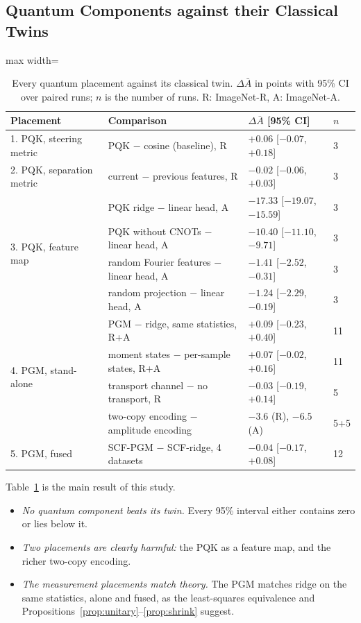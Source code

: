 \subsection{Quantum Components against their Classical Twins}

\begin{table}[t]
\centering
\caption{Every quantum placement against its classical twin. $\Delta\bar A$ in
points with 95\% CI over paired runs; $n$ is the number of runs.
R: ImageNet-R, A: ImageNet-A.}
\label{tab:quantum}
\setlength{\tabcolsep}{3pt}
\begin{adjustbox}{max width=\textwidth}
\begin{tabular}{llll}
\toprule
Placement & Comparison & $\Delta\bar A$ [95\% CI] & $n$ \\
\midrule
1. PQK, steering metric & PQK $-$ cosine (baseline), R & $+0.06$ [$-0.07$, $+0.18$] & 3 \\
2. PQK, separation metric & current $-$ previous features, R & $-0.02$ [$-0.06$, $+0.03$] & 3 \\
\multirow{4}{*}{3. PQK, feature map} & PQK ridge $-$ linear head, A & $-17.33$ [$-19.07$, $-15.59$] & 3 \\
 & PQK without CNOTs $-$ linear head, A & $-10.40$ [$-11.10$, $-9.71$] & 3 \\
 & random Fourier features $-$ linear head, A & $-1.41$ [$-2.52$, $-0.31$] & 3 \\
 & random projection $-$ linear head, A & $-1.24$ [$-2.29$, $-0.19$] & 3 \\
\midrule
\multirow{4}{*}{4. PGM, stand-alone} & PGM $-$ ridge, same statistics, R+A & $+0.09$ [$-0.23$, $+0.40$] & 11 \\
 & moment states $-$ per-sample states, R+A & $+0.07$ [$-0.02$, $+0.16$] & 11 \\
 & transport channel $-$ no transport, R & $-0.03$ [$-0.19$, $+0.14$] & 5 \\
 & two-copy encoding $-$ amplitude encoding & $-3.6$ (R), $-6.5$ (A) & 5+5 \\
5. PGM, fused & SCF-PGM $-$ SCF-ridge, 4 datasets & $-0.04$ [$-0.17$, $+0.08$] & 12 \\
\bottomrule
\end{tabular}
\end{adjustbox}
\end{table}

Table~\ref{tab:quantum} is the main result of this study.
\begin{itemize}
  \item \emph{No quantum component beats its twin.} Every 95\% interval
    either contains zero or lies below it.
  \item \emph{Two placements are clearly harmful:} the PQK as a feature map,
    and the richer two-copy encoding.
  \item \emph{The measurement placements match theory.} The PGM matches
    ridge on the same statistics, alone and fused, as the least-squares
    equivalence and Propositions~\ref{prop:unitary}--\ref{prop:shrink}
    suggest.
\end{itemize}

